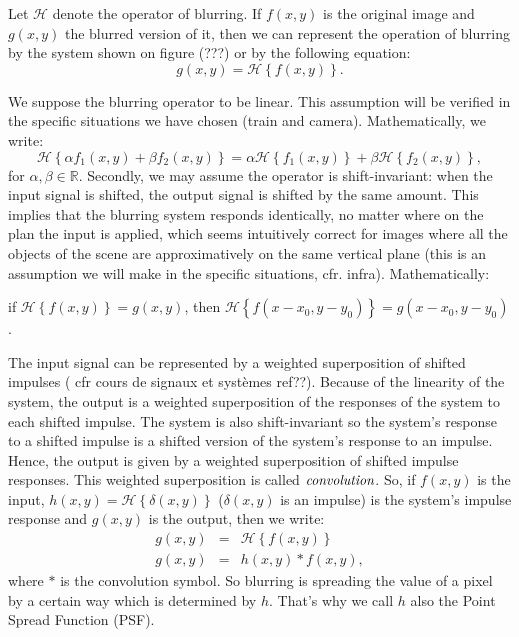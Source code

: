 Let $\mathcal{H}$ denote the operator of blurring. If $f(x,y)$ is the original image and $g(x,y)$ the blurred version of it, then we can represent the operation of blurring by the system shown on figure (???) or by the following equation:
\begin{equation}
g(x,y) = \mathcal{H}\left\lbrace f(x,y) \right\rbrace.
\end{equation}

We suppose the blurring operator to be linear. This assumption will be verified in the specific situations we have chosen (train and camera). Mathematically, we write:
\begin{equation}
\mathcal{H}\left\lbrace \alpha f_1(x,y) + \beta f_2(x,y) \right\rbrace =  \alpha \mathcal{H}\left\lbrace f_1(x,y)\right\rbrace + \beta \mathcal{H}\left\lbrace f_2(x,y)\right\rbrace,
\end{equation}
for $\alpha, \beta \in \mathbb{R}$.
Secondly, we may assume the operator is shift-invariant: when the input signal is shifted, the output signal is shifted by the same amount. This implies that the blurring system responds identically, no matter where on the plan the input is applied, which seems intuitively correct for images where all the objects of the scene are approximatively on the same vertical plane (this is an assumption we will make in the specific situations, cfr. infra). Mathematically:

if $\mathcal{H}\left\lbrace f(x,y) \right\rbrace = g(x,y)$, then $\mathcal{H}\left\lbrace f(x-x_0,y-y_0) \right\rbrace = g(x-x_0,y-y_0)$.


The input signal can be represented by a weighted superposition of shifted impulses ( cfr cours de signaux et systèmes ref??). Because of the linearity of the system, the output is a weighted superposition of the responses of the system to each shifted impulse. The system is also shift-invariant so the system's response to a shifted impulse is a shifted version of the system's response to an impulse. Hence, the output is given by a weighted superposition of shifted impulse responses. This weighted superposition is called $\emph{convolution}$. So, if $f(x,y)$ is the input, $h(x,y)=\mathcal{H}\left\lbrace \delta(x,y) \right\rbrace$ ($\delta(x,y)$ is an impulse) is the system's impulse response and $g(x,y)$ is the output, then we write:
\begin{eqnarray}
g(x,y) &=& \mathcal{H}\left\lbrace f(x,y) \right\rbrace \\
g(x,y) &=& h(x,y) \ast f(x,y),
\end{eqnarray}
where $\ast$ is the convolution symbol. So blurring is spreading the value of a pixel by a certain way which is determined by $h$. That's why we call $h$ also the Point Spread Function (PSF).

